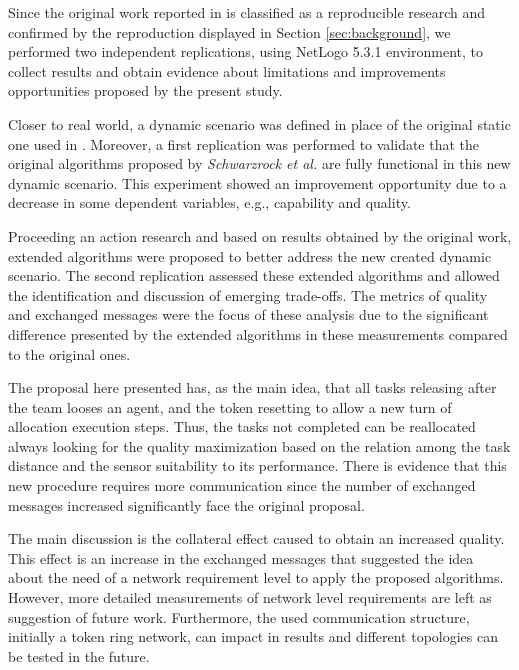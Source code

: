 Since the original work reported in \cite{MAS07} is classified as a reproducible research\cite{exp02} and confirmed by the reproduction displayed in Section \ref{sec:background}, we performed two independent replications, using NetLogo 5.3.1 environment, to collect results and obtain evidence about limitations and improvements opportunities proposed by the present study.

Closer to real world, a dynamic scenario was defined in place of the original static one used in \cite{MAS07}. Moreover, a first replication was performed to validate that the original algorithms proposed by \textit{Schwarzrock et al.} are fully functional in this new dynamic scenario. This experiment showed an improvement opportunity due to a decrease in some dependent variables, e.g., capability and quality. 

Proceeding an action research and based on results obtained by the original work, extended algorithms were proposed to better address the new created dynamic scenario. The second replication assessed these extended algorithms and allowed the identification and discussion of emerging trade-offs. The metrics of quality and exchanged messages were the focus of these analysis due to the significant difference presented by the extended algorithms in these measurements compared to the original ones.

The proposal here presented has, as the main idea, that all tasks releasing after the team looses an agent, and the token resetting to allow a new turn of allocation execution steps. Thus, the tasks not completed can be reallocated always looking for the quality maximization based on the relation among the task distance and the sensor suitability to its performance. There is evidence that this new procedure requires more communication since the number of exchanged messages increased significantly face the original proposal.

The main discussion is the collateral effect caused to obtain an increased quality. This effect is an increase in the exchanged messages that suggested the idea about the need of a network requirement level to apply the proposed algorithms. However, more detailed measurements of network level requirements are left as suggestion of future work. Furthermore, the used communication structure, initially a token ring network, can impact in results and different topologies can be tested in the future.